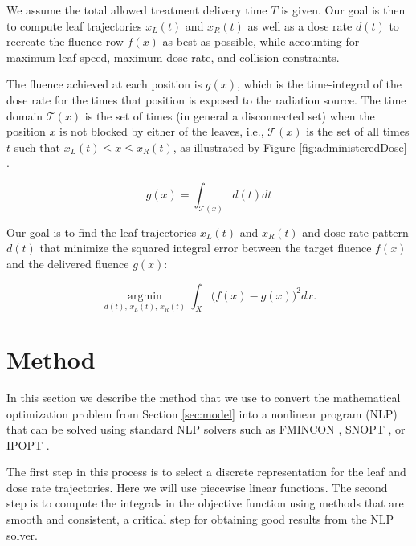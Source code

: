 \documentclass[12pt]{article}
\begin{document}
We assume the total allowed treatment delivery time $T$ is given. Our goal is then to compute leaf trajectories $x_L(t)$ and $x_R(t)$ as well as a dose rate $d(t)$ to recreate the fluence row $f(x)$ as best as possible, while accounting for maximum leaf speed, maximum dose rate, and collision constraints.

The fluence achieved at each position is $g(x)$, which is the time-integral of the dose rate for the times that position is exposed to the radiation source.
The time domain $\mathcal{T}(x)$ is the set of times (in general a disconnected set) when the position $x$ is not blocked by either of the leaves, i.e.,
$\mathcal{T}(x)$ is the set of all times $t$ such that $x_L(t) \le x \leq x_R(t)$,
as illustrated by Figure \ref{fig:administeredDose} .

\begin{equation}
g(x) = \int_{\mathcal{T}(x)} d(t) dt
\label{eqn:deliveredFluenceDose}
\end{equation}

Our goal is to find the leaf trajectories $x_L(t)$ and $x_R(t)$ and dose rate pattern $d(t)$
that minimize the squared integral error between the target fluence $f(x)$ and the delivered fluence $g(x)$:

\begin{equation}
\underset{d(t), \, x_L(t), \, x_R(t)}{\operatorname{argmin}}
\int_X \bigg(f(x) - g(x)\bigg)^2 dx .
\label{eqn:fluenceMapOptimization}
\end{equation}




\section{Method}

In this section we describe the method that we use to convert the mathematical optimization problem from Section \ref{sec:model} into a nonlinear program (NLP) that can be solved using standard NLP solvers such as FMINCON \cite{MatlabOptimizationToolbox2014}, SNOPT \cite{Snopt7}, or IPOPT \cite{Wachter2006}.

The first step in this process is to select a discrete representation for the leaf and dose rate trajectories. Here we will use piecewise linear functions. The second step is to compute the integrals in the objective function using methods that are smooth and consistent, a critical step for obtaining good results from the NLP solver.
\end{document}
